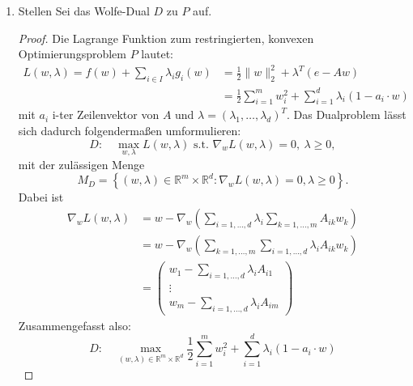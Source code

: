 \documentclass[12pt]{extreport} %
\newcommand{\R}{\mathbb{R}}
\theoremstyle{named}
\theoremstyle{nnamed}
\theoremstyle{itshape}
\theoremstyle{normal}
\begin{document}
\begin{enumerate}
\begin{proof}
			Beim gegebenen Problem ist $g_i(w) = - (A w)_i + 1$ für alle $i \in \{1, \dotsc, d \}$ eine lineare und somit konvexe Funktion. Da $f \in C^2(\R^m)$ mit $f(w) = \frac{1}{2} \sum_{i=1,\dotsc, m} w_i^2$ folgt $\nabla_w f(w) = w$ und 
			$$ D^2 f =  \left(\begin{array}{rrrrr} 1 & 0 & \dotsc & 0 \\ 0 & 1 & 0 & \vdots \\ \vdots & 0 & \ddots & 0\\ 0 &  \dotsc & 0 & 1 \end{array}\right) \succ 0, $$
			womit nach 2.5.10 $f$ insbesondere konvex und $P$ ein konvexes Optimierungsproblem ist.
		\end{proof}
	\item Stellen Sei das Wolfe-Dual $D$ zu $P$ auf.
		\begin{proof}
			Die Lagrange Funktion zum restringierten, konvexen Optimierungsproblem $P$ lautet:
			\begin{align*}
				L(w, \lambda) = f(w) + \sum_{i \in I} \lambda_i g_i(w) & = \frac{1}{2} \| w \|_2^2 + \lambda^T \left( e - Aw \right) \\
					& =\frac{1}{2} \sum_{i=1}^m w_i^2 + \sum_{i=1}^d \lambda_i \left(1 - a_i \cdot w \right)
			\end{align*}
			mit $a_i$ i-ter Zeilenvektor von $A$ und $\lambda = \left( \lambda_1, \dotsc, \lambda_d \right)^T$. Das Dualproblem lässt sich dadurch folgendermaßen umformulieren:
			$$ D: \quad \max_{w,\lambda} L(w, \lambda) \text{ s.t. } \nabla_w L(w, \lambda) = 0, ~\lambda \geq 0, $$
			mit der zulässigen Menge
			$$ M_D = \left\{ (w, \lambda) \in \R^m \times \R^d \colon \nabla_w L(w, \lambda) = 0, \lambda \geq 0 \right\}. $$
			Dabei ist 
			\begin{align*}
			 \nabla_w L(w, \lambda) & = w - \nabla_w \left( \sum_{i=1,\dotsc,d} \lambda_i \sum_{k=1, \dotsc, m} A_{ik}w_{k} \right) \\
			& = w - \nabla_w \left( \sum_{k=1, \dotsc, m}  \sum_{i=1,\dotsc,d}  \lambda_i A_{ik}w_{k} \right) \\
			& = \left(\begin{array}{c} w_1 -\sum_{i=1,\dotsc,d}  \lambda_i A_{i1}  \\ \vdots \\ w_m -\sum_{i=1,\dotsc,d}  \lambda_i A_{im} \end{array}\right) 
			\end{align*}
			Zusammengefasst also:
			$$ D: \quad \max_{(w, \lambda) \in \R^m \times \R^d} \frac{1}{2} \sum_{i=1}^m w_i^2 + \sum_{i=1}^d \lambda_i \left(1 - a_i \cdot w \right) $$

\end{proof}
\end{enumerate}
\end{document}
